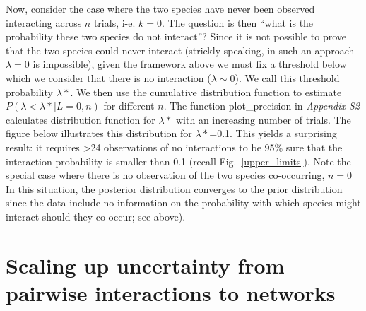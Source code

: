 \documentclass[12pt]{article}
\begin{document}
    Now, consider the case where the two species have never been observed interacting across $n$ trials, i-e. $k=0$. The question is then ``what is the probability these two species do not interact''? Since it is not possible to prove that the two species could never interact (strickly speaking, in such an approach $\lambda=0$ is impossible), given the framework above we must fix a threshold below which we consider that there is no interaction ($\lambda \sim 0$). We call this threshold probability $\lambda*$. We then use the cumulative distribution function to estimate $P(\lambda<\lambda*|L=0,n)$ for different $n$. The 
    function plot\_precision in \emph{Appendix S2} calculates distribution function for $\lambda*$ with an increasing number of trials. The figure below illustrates this distribution for $\lambda*$=0.1. This yields a surprising result: it requires \textgreater24 observations of no interactions to be 95\% sure that the interaction probability is smaller than 0.1 (recall Fig.~\ref{upper_limits}). Note the special case where there is no observation of the two species co-occurring, $n = 0$  In this situation, the posterior distribution converges to the prior distribution since the data include no information on the probability with which species might interact should they co-occur; see above).


\section*{Scaling up uncertainty from pairwise interactions to networks}
\end{document}

